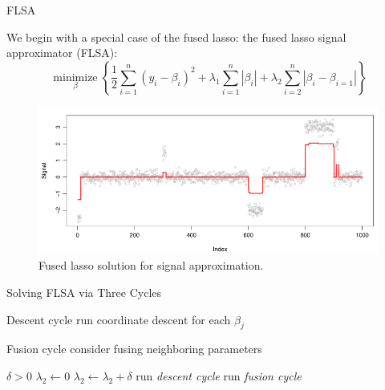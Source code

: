 \documentclass[10pt,ignorenonframetext]{beamer}
\begin{document}
\begin{frame}{FLSA}

We begin with a special case of the fused lasso: the fused lasso signal approximator (FLSA):
\[
\operatorname*{minimize}_\beta \left\{ \frac 12 \sum_{i=1}^n(y_i - \beta_i)^2 + \lambda_1 \sum_{i=1}^n|\beta_i| + \lambda_2 \sum_{i=2}^n |\beta_i - \beta_{i=1}|\right\}
\]

\begin{figure}
    \centering
    \includegraphics[width=\linewidth]{figures/fused-lasso-illustration.png}
    \caption{Fused lasso solution for signal approximation.}
\end{figure}
    
\end{frame}

\begin{frame}{Solving FLSA via Three Cycles}

\begin{block}{Descent cycle}
    run coordinate descent for each \(\beta_j\)
\end{block}

\begin{block}{Fusion cycle}
    consider fusing neighboring parameters
\end{block}

\begin{algorithm}[H]
\caption{CD for the fused lasso (smoothing cycle).}
    \begin{algorithmic}
        \Require \(\delta > 0\)
        \State \(\lambda_2 \gets 0\)
        \Repeat 
            \State \(\lambda_2 \gets \lambda_2 + \delta\)
            \Repeat 
                \State run \emph{descent cycle}
                \State run \emph{fusion cycle}
    \end{algorithmic}
\end{algorithm}
\end{frame}
\end{document}
